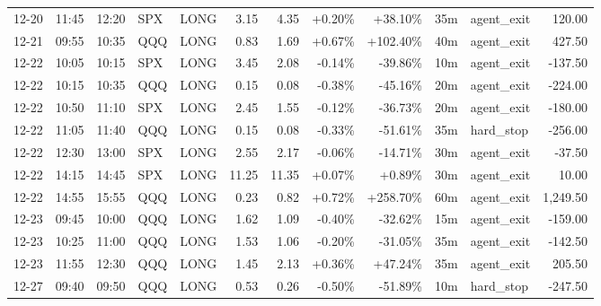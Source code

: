 \documentclass[11pt,a4paper,twoside]{article}
\begin{document}
\begin{center}
\begin{longtable}{>{\color{txtmain}}l l l l l r r r r r >{\color{txtmain}}l r}
12-20 & 11:45 & 12:20 & SPX & LONG & 3.15 & 4.35 & \textcolor{wingreen}{+0.20\%} & \textcolor{wingreen}{+38.10\%} & 35m & agent\_exit & \textcolor{wingreen}{120.00} \\
12-21 & 09:55 & 10:35 & QQQ & LONG & 0.83 & 1.69 & \textcolor{wingreen}{+0.67\%} & \textcolor{wingreen}{+102.40\%} & 40m & agent\_exit & \textcolor{wingreen}{427.50} \\
12-22 & 10:05 & 10:15 & SPX & LONG & 3.45 & 2.08 & \textcolor{lossred}{-0.14\%} & \textcolor{lossred}{-39.86\%} & 10m & agent\_exit & \textcolor{lossred}{-137.50} \\
12-22 & 10:15 & 10:35 & QQQ & LONG & 0.15 & 0.08 & \textcolor{lossred}{-0.38\%} & \textcolor{lossred}{-45.16\%} & 20m & agent\_exit & \textcolor{lossred}{-224.00} \\
12-22 & 10:50 & 11:10 & SPX & LONG & 2.45 & 1.55 & \textcolor{lossred}{-0.12\%} & \textcolor{lossred}{-36.73\%} & 20m & agent\_exit & \textcolor{lossred}{-180.00} \\
12-22 & 11:05 & 11:40 & QQQ & LONG & 0.15 & 0.08 & \textcolor{lossred}{-0.33\%} & \textcolor{lossred}{-51.61\%} & 35m & hard\_stop & \textcolor{lossred}{-256.00} \\
12-22 & 12:30 & 13:00 & SPX & LONG & 2.55 & 2.17 & \textcolor{lossred}{-0.06\%} & \textcolor{lossred}{-14.71\%} & 30m & agent\_exit & \textcolor{lossred}{-37.50} \\
12-22 & 14:15 & 14:45 & SPX & LONG & 11.25 & 11.35 & \textcolor{wingreen}{+0.07\%} & \textcolor{wingreen}{+0.89\%} & 30m & agent\_exit & \textcolor{wingreen}{10.00} \\
12-22 & 14:55 & 15:55 & QQQ & LONG & 0.23 & 0.82 & \textcolor{wingreen}{+0.72\%} & \textcolor{wingreen}{+258.70\%} & 60m & agent\_exit & \textcolor{wingreen}{1,249.50} \\
12-23 & 09:45 & 10:00 & QQQ & LONG & 1.62 & 1.09 & \textcolor{lossred}{-0.40\%} & \textcolor{lossred}{-32.62\%} & 15m & agent\_exit & \textcolor{lossred}{-159.00} \\
12-23 & 10:25 & 11:00 & QQQ & LONG & 1.53 & 1.06 & \textcolor{lossred}{-0.20\%} & \textcolor{lossred}{-31.05\%} & 35m & agent\_exit & \textcolor{lossred}{-142.50} \\
12-23 & 11:55 & 12:30 & QQQ & LONG & 1.45 & 2.13 & \textcolor{wingreen}{+0.36\%} & \textcolor{wingreen}{+47.24\%} & 35m & agent\_exit & \textcolor{wingreen}{205.50} \\
12-27 & 09:40 & 09:50 & QQQ & LONG & 0.53 & 0.26 & \textcolor{lossred}{-0.50\%} & \textcolor{lossred}{-51.89\%} & 10m & hard\_stop & \textcolor{lossred}{-247.50} \\

\end{longtable}
\end{center}
\end{document}
